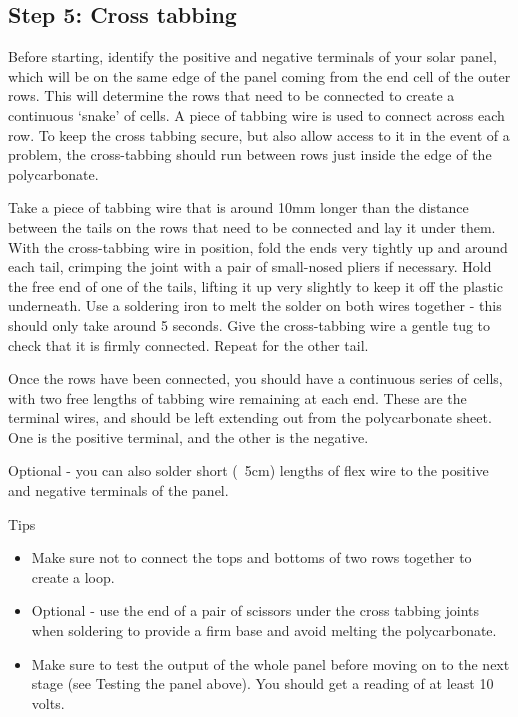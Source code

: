 \documentclass{article}
\theoremstyle{definition}
\theoremstyle{definition}
\theoremstyle{remark}
\begin{document}

  {\color{blue}\subsection{Step 5: Cross tabbing}} %
  \label{sub:step_5_cross_tabbing}

    Before starting, identify the positive and negative terminals of your solar panel, which will be on the same edge of the panel coming from the end cell of the outer rows. This will determine the rows that need to be connected to create a continuous ‘snake’ of cells. A piece of tabbing wire is used to connect across each row. To keep the cross tabbing secure, but also allow access to it in the event of a problem, the cross-tabbing should run between rows just inside the edge of the polycarbonate. 

    Take a piece of tabbing wire that is around 10mm longer than the distance between the tails on the rows that need to be connected and lay it under them. With the cross-tabbing wire in position, fold the ends very tightly up and around each tail, crimping the joint with a pair of small-nosed pliers if necessary. Hold the free end of one of the tails, lifting it up very slightly to keep it off the plastic underneath. Use a soldering iron to melt the solder on both wires together - this should only take around 5 seconds. Give the cross-tabbing wire a gentle tug to check that it is firmly connected. Repeat for the other tail. 

    Once the rows have been connected, you should have a continuous series of cells, with two free lengths of tabbing wire remaining at each end. These are the terminal wires, and should be left extending out from the polycarbonate sheet. One is the positive terminal, and the other is the negative.

    Optional - you can also solder short (~5cm) lengths of flex wire to the positive and negative terminals of the panel.

    Tips

    \begin{itemize}
      \item Make sure not to connect the tops and bottoms of two rows together to create a loop. 
      \item Optional - use the end of a pair of scissors under the cross tabbing joints when soldering to provide a firm base and avoid melting the polycarbonate. 
      \item Make sure to test the output of the whole panel before moving on to the next stage (see Testing the panel above). You should get a reading of at least 10 volts.
    \end{itemize}
\end{document}
